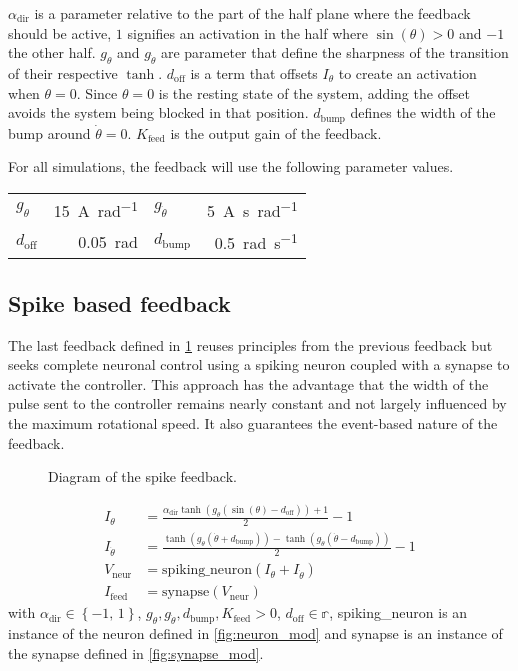 $\alpha_\text{dir}$ is a parameter relative to the part of the half plane where the feedback should be active, $1$ signifies an activation in the half where $\sin\left(\theta\right)>0$ and $-1$ the other half.
$g_\theta$ and $g_{\dot{\theta}}$ are parameter that define the sharpness of the transition of their respective $\tanh$.
$d_\text{off}$ is a term that offsets $I_\theta$ to create an activation when $\theta = 0$. Since $\theta = 0$ is the resting state of the system, adding the offset avoids the system being blocked in that position.
$d_\text{bump}$ defines the width of the bump around $\dot{\theta} = 0$.
$K_\text{feed}$ is the output gain of the feedback.

For all simulations, the feedback will use the following parameter values.
{

\large\centering
\begin{tabular}{lr|lr}
    $g_\theta$      & \qty{15}{\ampere\per\radian}   & $g_{\dot{\theta}}$    & \qty{5}{\ampere\second\per\radian}\\
    $d_\text{off}$ & \qty{0.05}{\radian}  & $d_\text{bump}$       & \qty{0.5}{\radian\per\second}
\end{tabular}

}

\subsection{Spike based feedback}

The last feedback defined in \cref{fig:spike_feed} reuses principles from the previous feedback but seeks complete neuronal control using a spiking neuron coupled with a synapse to activate the controller.
This approach has the advantage that the width of the pulse sent to the controller remains nearly constant and not largely influenced by the maximum rotational speed.
It also guarantees the event-based nature of the feedback.

\begin{figure}[!htb]
    \centering
    \caption{Diagram of the spike feedback.}
    \label{fig:spike_feed}
\end{figure}

\begin{align}
    I_\theta &= \frac{\alpha_\text{dir}\tanh\left(g_\theta\left(\sin\left(\theta\right)-d_\text{off}\right)\right) + 1}{2} - 1\\
    I_{\dot{\theta}} &= \frac{\tanh\left(g_{\dot{\theta}}\left(\dot{\theta}+d_\text{bump}\right)\right) -\tanh\left(g_{\dot{\theta}}\left(\dot{\theta}-d_\text{bump}\right)\right)}{2}-1\\
    V_\text{neur} &= \text{spiking\_neuron}\left(I_\theta + I_{\dot{\theta}}\right)\\
    I_\text{feed} &= \text{synapse}\left(V_\text{neur}\right)
\end{align}
with $\alpha_\text{dir} \in \left\{-1,\,1\right\}$, $g_\theta, g_{\dot{\theta}}, d_\text{bump}, K_\text{feed} > 0$, $d_\text{off} \in \mathbb{r}$, spiking\_neuron is an instance of the neuron defined in \cref{fig:neuron_mod} and synapse is an instance of the synapse defined in \cref{fig:synapse_mod}.

